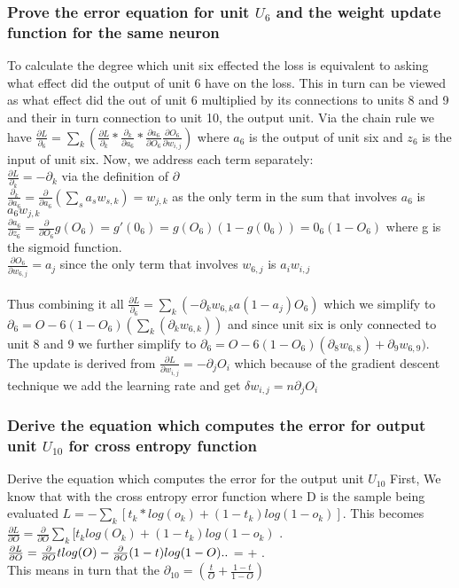 \documentclass[11pt]{article}
\begin{document}
\subsubsection{Prove the error equation for unit $U_6$ and the weight update function for the same neuron}
To calculate the degree which unit six effected the loss is equivalent to asking what effect did the output of unit 6 have on the loss. This in turn can be viewed as what effect did the out of unit 6 multiplied by its connections to units 8 and 9 and their in turn connection to unit 10, the output unit. Via the chain rule we have $\frac{\partial L}{\partial_6} = \sum_k (\frac{\partial L}{\partial_k} * \frac{\partial_k}{\partial a_6} * \frac{\partial a_6}{\partial O_6} \frac{\partial O_6}{\partial w_{i,j}})$ where $a_6$ is the output of unit six and $z_6$ is the input of unit six. Now, we address each term separately: \\
$\frac{\partial L}{\partial_k} = - \partial_k$ via the definition of $\partial$ \\
$\frac{\partial_k}{\partial a_6} = \frac{\partial}{\partial a_6} (\sum_s a_s w_{s,k}) = w_{j,k}$ as the only term in the sum that involves $a_6$ is $a_6 w_{j,k}$\\
$\frac{\partial a_6}{\partial z_6} = \frac{\partial}{\partial O_6} g(O_6)= g'(0_6) = g(O_6)(1-g(0_6)) = 0_6(1-O_6)$ where g is the sigmoid function.\\
$\frac{\partial O_6}{\partial w_{6,j}} = a_j$ since the only term that involves $w_{6,j}$ is $a_i w_{i,j}$ \\ \\
Thus combining it all $\frac{\partial L}{\partial_6} = \sum_k (-\partial_k w_{6,k} a(1-a_j) O_6)$
which we simplify to $\partial_6 = O-6(1-O_6)(\sum_k (\partial_k w_{6,k}))$ and since unit six is only connected to unit 8 and 9 we further simplify to $\partial_6 = O-6(1-O_6)(\partial_8 w_{6,8}) + \partial_9 w_{6,9})$. \\ 
The update is derived from $\frac{\partial L}{\partial w_{i,j}} = -\partial_j O_i$ which because of the gradient descent technique we add  the learning rate and get $\delta w_{i,j} = n \partial_j O_i$
\subsubsection{Derive the equation which computes the error for output unit $U_10$ for cross entropy function}
Derive the equation which computes the error for the output unit $U_10$ 
First, We know that with the cross entropy error function where D is the sample being evaluated $L= -\sum_k [t_k *log(o_k) + (1-t_k)log(1-o_k)]$. This becomes \\
$\frac{\partial L}{\partial O} = \frac{\partial}{\partial O} \sum_k [t_k log(O_k) + (1-t_k)log(1-o_k)$ . \\
$\frac{\partial L}{\partial O} = \frac{\partial}{\partial O} t log(O) - \frac{\partial}{\partial O} (1-t)log(1-O) .. \\
$ =  + . \\
This means in turn that the $\partial_10 = (\frac{t}{O} + \frac{1-t}{1-O})$
\end{document}

